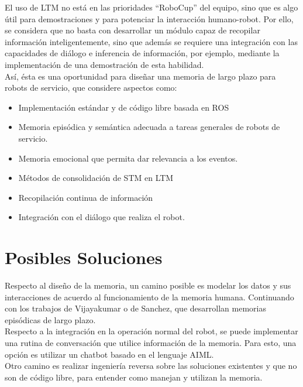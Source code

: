 \documentclass[12pt,letterpaper,spanish]{article}
\begin{document}
El uso de LTM no est\'a en las prioridades ``RoboCup'' del equipo, sino que es algo \'util para demostraciones y para potenciar la interacci\'on humano-robot. Por ello, se considera que no basta con desarrollar un m\'odulo capaz de recopilar informaci\'on inteligentemente, sino que adem\'as se requiere una integraci\'on con las capacidades de di\'alogo e inferencia de informaci\'on, por ejemplo, mediante la implementaci\'on de una demostraci\'on de esta habilidad.\\

As\'i, \'esta es una oportunidad para dise\~nar una memoria de largo plazo para robots de servicio, que considere aspectos como: 
\begin{itemize}
\item Implementaci\'on est\'andar y de c\'odigo libre basada en ROS
\item Memoria epis\'odica y sem\'antica adecuada a tareas generales de robots de servicio.
\item Memoria emocional que permita dar relevancia a los eventos.
\item M\'etodos de consolidaci\'on de STM en LTM
\item Recopilaci\'on continua de informaci\'on
\item Integraci\'on con el di\'alogo que realiza el robot.
\end{itemize}


\section{Posibles Soluciones}

Respecto al dise\~no de la memoria, un camino posible es modelar los datos y sus interacciones de acuerdo al funcionamiento de la memoria humana. Continuando con los trabajos de Vijayakumar\cite{Vijayakumar2014} o de Sanchez\cite{Sanchez:2015}, que desarrollan memorias epis\'odicas de largo plazo.\\

Respecto a la integraci\'on en la operaci\'on normal del robot, se puede implementar una rutina de conversaci\'on que utilice informaci\'on de la memoria. Para esto, una opci\'on es utilizar un chatbot basado en el lenguaje AIML.\\

Otro camino es realizar ingenier\'ia reversa sobre las soluciones existentes y que no son de c\'odigo libre, para entender como manejan y utilizan la memoria.\\
\end{document}

